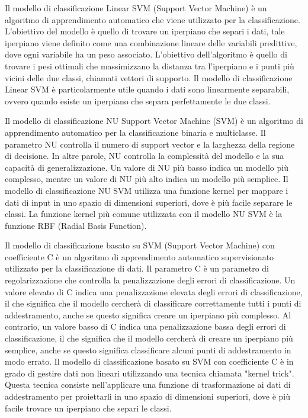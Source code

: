 \documentclass[italian,12pt,a4paper]{article}
\begin{document}
    Il modello di classificazione Linear SVM (Support Vector Machine) è un algoritmo di apprendimento automatico che viene utilizzato per la classificazione. L'obiettivo del modello è quello di trovare un iperpiano che separi i dati, tale iperpiano viene definito come una combinazione lineare delle variabili predittive, dove ogni variabile ha un peso associato. L'obiettivo dell'algoritmo è quello di trovare i pesi ottimali che massimizzano la distanza tra l'iperpiano e i punti più vicini delle due classi, chiamati vettori di supporto. Il modello di classificazione Linear SVM è particolarmente utile quando i dati sono linearmente separabili, ovvero quando esiste un iperpiano che separa perfettamente le due classi.
    \\ 
    \vspace{25pt}

    Il modello di classificazione NU Support Vector Machine (SVM) è un algoritmo di apprendimento automatico per la classificazione binaria e multiclasse. Il parametro NU controlla il numero di support vector e la larghezza della regione di decisione. In altre parole, NU controlla la complessità del modello e la sua capacità di generalizzazione. Un valore di NU più basso indica un modello più complesso, mentre un valore di NU più alto indica un modello più semplice. Il modello di classificazione NU SVM utilizza una funzione kernel per mappare i dati di input in uno spazio di dimensioni superiori, dove è più facile separare le classi. La funzione kernel più comune utilizzata con il modello NU SVM è la funzione RBF (Radial Basis Function).
    \\
    \vspace{25pt}

    Il modello di classificazione basato su SVM (Support Vector Machine) con coefficiente C è un algoritmo di apprendimento automatico supervisionato utilizzato per la classificazione di dati. Il parametro C è un parametro di regolarizzazione che controlla la penalizzazione degli errori di classificazione. Un valore elevato di C indica una penalizzazione elevata degli errori di classificazione, il che significa che il modello cercherà di classificare correttamente tutti i punti di addestramento, anche se questo significa creare un iperpiano più complesso. Al contrario, un valore basso di C indica una penalizzazione bassa degli errori di classificazione, il che significa che il modello cercherà di creare un iperpiano più semplice, anche se questo significa classificare alcuni punti di addestramento in modo errato. Il modello di classificazione basato su SVM con coefficiente C è in grado di gestire dati non lineari utilizzando una tecnica chiamata "kernel trick". Questa tecnica consiste nell'applicare una funzione di trasformazione ai dati di addestramento per proiettarli in uno spazio di dimensioni superiori, dove è più facile trovare un iperpiano che separi le classi. 
    \\
    \vspace{25pt}
   
\end{document}
